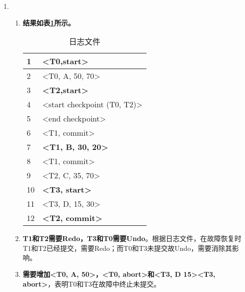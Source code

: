 \documentclass[10pt, a4paper]{article}
\begin{document}
\begin{enumerate}
\begin{table}[htb]
			\end{table}
		\item \begin{enumerate}
			\item \textbf{结果如表\ref{tab:5_a}所示。}
			\begin{table}[htb]
				\centering
				\begin{tabular}{|l|l|}
				\hline
				1  & \textbf{\textless{}T0,start\textgreater{}}         \\ \hline
				2  & \textless{}T0, A, 50, 70\textgreater{}             \\ \hline
				3  & \textbf{\textless{}T2,start\textgreater{}}         \\ \hline
				4  & \textless{}start checkpoint (T0, T2)\textgreater{} \\ \hline
				5  & \textless{}end checkpoint\textgreater{}            \\ \hline
				6  & \textless{}T1, commit\textgreater{}                \\ \hline
				7  & \textbf{\textless{}T1, B, 30, 20\textgreater{}}    \\ \hline
				8  & \textless{}T1, commit\textgreater{}                \\ \hline
				9  & \textless{}T2, C, 35, 70\textgreater{}             \\ \hline
				10 & \textbf{\textless{}T3, start\textgreater{}}        \\ \hline
				11 & \textless{}T3, D, 15, 30\textgreater{}             \\ \hline
				12 & \textbf{\textless{}T2, commit\textgreater{}}       \\ \hline
				\end{tabular}
				\caption{日志文件}\label{tab:5_a}
				\end{table}
			\item \textbf{T1和T2需要Redo，T3和T0需要Undo}。根据日志文件，在故障恢复时T1和T2已经提交，需要Redo；而T0和T3未提交故Undo，需要消除其影响。
			\item \textbf{需要增加<T0, A, 50>，<T0, abort>和<T3, D 15><T3, abort>}，表明T0和T3在故障中终止未提交。
		\end{enumerate}
	\end{enumerate}
\end{document}

